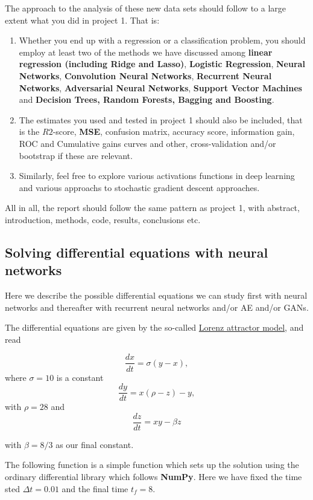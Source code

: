 \documentclass[%
oneside,                 %
final,                   %
10pt]{article}
\begin{document}
\noindent
The approach to the analysis of these new data sets should follow to a large extent what you did in project 1. That is:
\begin{enumerate}
\item Whether you end up with a regression or a classification problem, you should employ at least two of the methods we have discussed among \textbf{linear regression (including Ridge and Lasso)}, \textbf{Logistic Regression}, \textbf{Neural Networks}, \textbf{Convolution Neural Networks}, \textbf{Recurrent Neural Networks}, \textbf{Adversarial Neural Networks}, \textbf{Support Vector Machines} and \textbf{Decision Trees, Random Forests, Bagging and Boosting}. 

\item The estimates you used and tested in project 1 should also be included, that is the $R2$-score, \textbf{MSE}, confusion matrix, accuracy score, information gain,  ROC and Cumulative gains curves and other, cross-validation and/or bootstrap if these are relevant.

\item Similarly, feel free to explore various activations functions in deep learning and various approachs to stochastic gradient descent approaches.
\end{enumerate}

\noindent
All in all, the report should follow the same pattern as project 1, with abstract, introduction, methods, code, results, conclusions etc.

\subsection*{Solving  differential equations with neural networks}

Here we describe the possible differential equations we can study
first with neural networks and thereafter with recurrent neural
networks and/or AE and/or GANs.

The differential equations are given by the so-called \href{{https://encyclopediaofmath.org/index.php?title=Lorenz_attractor}}{Lorenz attractor model}, and read

\[
\frac{dx}{dt}=\sigma\left(y-x\right),
\]
where $\sigma =10$ is a constant
\[
\frac{dy}{dt}= x\left(\rho-z\right)-y,
\]
with $\rho=28$ and
\[
\frac{dz}{dt}=xy-\beta z
\]

with $\beta=8/3$ as our final constant.

The following function is a
simple function which sets up the solution using the ordinary
differential library which follows \textbf{NumPy}. Here we have fixed the
time sted $\Delta t=0.01$ and the final time $t_f=8$.
\end{document}
